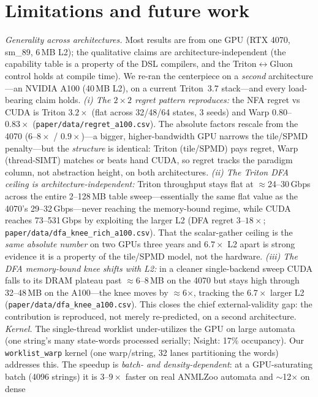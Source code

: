 \documentclass[conference]{IEEEtran}
\begin{document}
\section{Limitations and future work}\label{sec:limits}
\emph{Generality across architectures.} Most results are from one GPU (RTX 4070, sm\_89,
6\,MB L2); the qualitative claims are architecture-independent (the capability table is a
property of the DSL compilers, and the Triton$\leftrightarrow$Gluon control holds at compile
time). We re-ran the centerpiece on a \emph{second} architecture---an NVIDIA A100 (40\,MB L2),
on a current Triton~3.7 stack---and every load-bearing claim holds. \emph{(i) The $2\times2$
regret pattern reproduces:} the NFA regret vs CUDA is Triton $3.2\times$ (flat across 32/48/64
states, 3 seeds) and Warp $0.80$--$0.83\times$ (\texttt{paper/data/regret\_a100.csv}). The
absolute factors rescale from the 4070 ($6$--$8\times$ / $0.9\times$)---a bigger,
higher-bandwidth GPU narrows the tile/SPMD penalty---but the \emph{structure} is identical:
Triton (tile/SPMD) pays regret, Warp (thread-SIMT) matches or beats hand CUDA, so regret tracks
the paradigm column, not abstraction height, on both architectures. \emph{(ii) The Triton DFA
ceiling is architecture-independent:} Triton throughput stays flat at $\approx$24--30\,Gbps
across the entire 2--128\,MB table sweep---essentially the same flat value as the 4070's
29--32\,Gbps---never reaching the memory-bound regime, while CUDA reaches 73--531\,Gbps by
exploiting the larger L2 (DFA regret $3$--$18\times$; \texttt{paper/data/dfa\_knee\_rich\_a100.csv}).
That the scalar-gather ceiling is the \emph{same absolute number} on two GPUs three years and
$6.7\times$ L2 apart is strong evidence it is a property of the tile/SPMD model, not the hardware.
\emph{(iii) The DFA memory-bound knee shifts with L2:} in a cleaner single-backend sweep CUDA
falls to its DRAM plateau past $\approx$6--8\,MB on the 4070 but stays high through 32--48\,MB on
the A100---the knee moves by $\approx$6$\times$, tracking the $6.7\times$ larger L2
(\texttt{paper/data/dfa\_knee\_a100.csv}). This closes the chief external-validity gap: the
contribution is reproduced, not merely re-predicted, on a second architecture.
\emph{Kernel.} The single-thread worklist under-utilizes the GPU on large automata (one
string's many state-words processed serially; Nsight: 17\% occupancy). Our
\texttt{worklist\_warp} kernel (one warp/string, 32 lanes partitioning the words) addresses
this. The speedup is \emph{batch- and density-dependent}: at a GPU-saturating batch (4096
strings) it is $3$--$9\times$ faster on real ANMLZoo automata and $\sim$12$\times$ on dense
\end{document}
